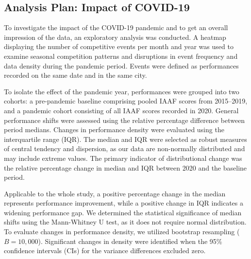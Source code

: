 \subsection{Analysis Plan: Impact of COVID-19} \label{subsec:covid_analysis}
To investigate the impact of the COVID-19 pandemic and to get an overall impression of the data, an exploratory analysis was conducted. A heatmap displaying the number of competitive events per month and year was used to examine seasonal competition patterns and disruptions in event frequency and data density during the pandemic period. Events were defined as performances recorded on the same date and in the same city.

To isolate the effect of the pandemic year, performances were grouped into two cohorts: a pre-pandemic baseline comprising pooled IAAF scores from 2015–2019, and a pandemic cohort consisting of all IAAF scores recorded in 2020. General performance shifts were assessed using the relative percentage difference between period medians. Changes in performance density were evaluated using the interquartile range (IQR). The median and IQR were selected as robust measures of central tendency and dispersion, as our data are non-normally distributed and may include extreme values. The primary indicator of distributional change was the relative percentage change in median and IQR between 2020 and the baseline period.

Applicable to the whole study, a positive percentage change in the median represents performance improvement, while a positive change in IQR indicates a widening performance gap. We determined the statistical significance of median shifts using the Mann-Whitney U test, as it does not require normal distribution. To evaluate changes in performance density, we utilized bootstrap resampling ($B=10,000$). Significant changes in density were identified when the 95\% confidence intervals (CIs) for the variance differences excluded zero.